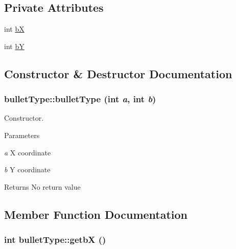 \subsection*{Private Attributes}
\begin{DoxyCompactItemize}
\item 
int \hyperlink{classbulletType_a0078ec4eb7df2062788ae69200a73bf3}{bX}
\item 
int \hyperlink{classbulletType_a7083d68e84fe928b1e46575fda710d5d}{bY}
\end{DoxyCompactItemize}


\subsection{Constructor \& Destructor Documentation}
\hypertarget{classbulletType_ad854048f38d7514caa09af4ab034837b}{
\subsubsection[{bulletType}]{\setlength{\rightskip}{0pt plus 5cm}bulletType::bulletType (int {\em a}, \/  int {\em b})}}
\label{classbulletType_ad854048f38d7514caa09af4ab034837b}


Constructor. 
\begin{DoxyParams}{Parameters}
\item[{\em a}]X coordinate \item[{\em b}]Y coordinate \end{DoxyParams}
\begin{DoxyReturn}{Returns}
No return value 
\end{DoxyReturn}


\subsection{Member Function Documentation}
\hypertarget{classbulletType_a3a40c67dcf6d3b6dc91e6fa7800cdaf4}{
\subsubsection[{getbX}]{\setlength{\rightskip}{0pt plus 5cm}int bulletType::getbX ()}}
\label{classbulletType_a3a40c67dcf6d3b6dc91e6fa7800cdaf4}


